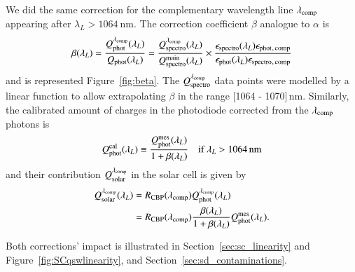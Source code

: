 We did the same correction for the complementary wavelength line $\lambda_{\rm comp}$ appearing after $\lambda_L > \SI{1064}{\nm}$. The correction coefficient $\beta$ analogue to $\alpha$ is
\begin{equation}
    \beta(\lambda_L) = \frac{Q_{\mathrm{phot}}^{\lambda_{\rm comp}}(\lambda_L)}{Q_{\mathrm{phot}}(\lambda_L)} = \frac{Q_{\mathrm{spectro}}^{\lambda_{\rm comp}}(\lambda_L)}{Q_{\mathrm{spectro}}^{\mathrm{main}}(\lambda_L)} \times \frac{\epsilon_{\mathrm{spectro}}(\lambda_L)\epsilon_{\mathrm{phot}}{}_{\mathrm{, \, comp}}}{\epsilon_{\mathrm{phot}}(\lambda_L)\epsilon_{\mathrm{spectro}}{}_{\mathrm{, \, comp}}} 
    \label{eq:beta}
\end{equation}
and is represented Figure~\ref{fig:beta}. The $Q_{\mathrm{spectro}}^{\lambda_{\rm comp}}$ data points were modelled by a linear function to allow extrapolating $\beta$ in the range [1064 - 1070]\,nm. Similarly, the calibrated amount of charges in the photodiode corrected from the $\lambda_{\rm comp}$ photons is
\begin{equation}
        Q_{\mathrm{phot}}^{\mathrm{cal}}(\lambda_L) \equiv  \frac{Q_{\mathrm{phot}}^{\mathrm{mes}}(\lambda_L)}{1 + \beta(\lambda_L)} \quad\text{if}\ \lambda_L > \SI{1064}{\nano\meter}
        \label{eq:qphot_cal1064}
\end{equation}
and their contribution $Q_{\mathrm{solar}}^{\lambda_{\rm comp}}$ in the solar cell is given by
\begin{equation}
\begin{aligned}
    Q_{\mathrm{solar}}^{\lambda_{\rm comp}}(\lambda_L) & = R_{\mathrm{CBP}}(\lambda_{\rm comp})  Q_{\mathrm{phot}}^{\lambda_{\rm comp}}(\lambda_L) \\ 
    & = R_{\mathrm{CBP}}(\lambda_{\rm comp}) \frac{ \beta(\lambda_L) }{1+ \beta(\lambda_L)} Q_{\mathrm{phot}}^{\mathrm{mes}}(\lambda_L).
    \label{eq:qsolar_cal1064}
\end{aligned}
\end{equation}

Both corrections' impact is illustrated in Section~\ref{sec:sc_linearity} and Figure~\ref{fig:SCqswlinearity}, and Section~\ref{sec:sd_contaminations}.


